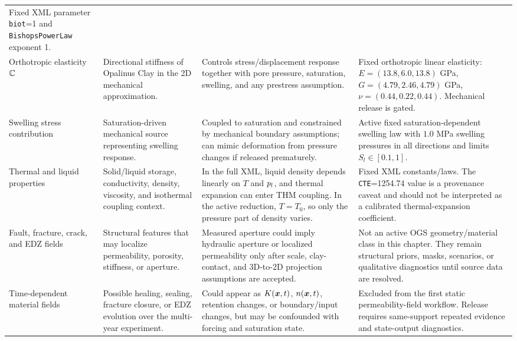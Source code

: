 \begin{longtable}{@{}L{0.17\textwidth} L{0.27\textwidth} L{0.24\textwidth} L{0.22\textwidth}@{}}
Fixed XML parameter \texttt{biot}=1 and \texttt{BishopsPowerLaw} exponent 1.\\
Orthotropic elasticity \(\mathbb{C}\) &
Directional stiffness of Opalinus Clay in the 2D mechanical approximation. &
Controls stress/displacement response together with pore pressure, saturation,
swelling, and any prestress assumption. &
Fixed orthotropic linear elasticity: \(E=(13.8,6.0,13.8)\) GPa,
\(G=(4.79,2.46,4.79)\) GPa, \(\nu=(0.44,0.22,0.44)\).  Mechanical release is gated.\\
Swelling stress contribution &
Saturation-driven mechanical source representing swelling response. &
Coupled to saturation and constrained by mechanical boundary assumptions; can mimic
deformation from pressure changes if released prematurely. &
Active fixed saturation-dependent swelling law with \(1.0\) MPa swelling
pressures in all directions and limits \(S_l\in[0.1,1]\).\\
Thermal and liquid properties &
Solid/liquid storage, conductivity, density, viscosity, and isothermal coupling
context. &
In the full XML, liquid density depends linearly on \(T\) and \(p_l\), and thermal
expansion can enter THM coupling.  In the active reduction, \(T=T_0\), so only the
pressure part of density varies. &
Fixed XML constants/laws.  The \texttt{CTE}=1254.74 value is a provenance caveat and
should not be interpreted as a calibrated thermal-expansion coefficient.\\
Fault, fracture, crack, and EDZ fields &
Structural features that may localize permeability, porosity, stiffness, or aperture. &
Measured aperture could imply hydraulic aperture or localized permeability only after
scale, clay-contact, and 3D-to-2D projection assumptions are accepted. &
Not an active OGS geometry/material class in this chapter.  They remain structural
priors, masks, scenarios, or qualitative diagnostics until source data are resolved.\\
Time-dependent material fields &
Possible healing, sealing, fracture closure, or EDZ evolution over the multi-year
experiment. &
Could appear as \(K(\bm{x},t)\), \(n(\bm{x},t)\), retention changes, or boundary/input
changes, but may be confounded with forcing and saturation state. &
Excluded from the first static permeability-field workflow.  Release requires
same-support repeated evidence and state-output diagnostics.\\
\end{longtable}
\endgroup
